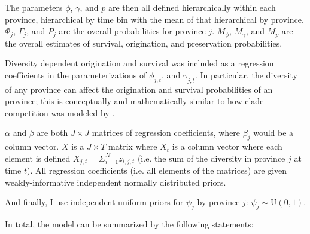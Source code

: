 \documentclass[12pt,letterpaper]{article}
\begin{document}
The parameters \(\phi\), \(\gamma\), and \(p\) are then all defined hierarchically within each province, hierarchical by time bin with the mean of that hierarchical by province. \(\Phi_{j}\), \(\Gamma_{j}\), and \(P_{j}\) are the overall probabilities for province \(j\). \(M_{\phi}\), \(M_{\gamma}\), and \(M_{p}\) are the overall estimates of survival, origination, and preservation probabilities. 

Diversity dependent origination and survival was included as a regression coefficients in the parameterizations of \(\phi_{j, t}\), and \(\gamma_{j, t}\). In particular, the diversity of any province can affect the origination and survival probabilities of an province; this is conceptually and mathematically similar to how clade competition was modeled by \citet{Silvestro2015b}. 

\(\alpha\) and \(\beta\) are both \(J \times J\) matrices of regression coefficients, where \(\beta_{j}\) would be a column vector. \(X\) is a \(J \times T\) matrix where \(X_{t}\) is a column vector where each element is defined \(X_{j, t} = \Sigma_{i = 1}^{N} z_{i, j, t}\) (i.e. the sum of the diversity in province \(j\) at time \(t\)). All regression coefficients (i.e. all elements of the matrices) are given weakly-informative independent normally distributed priors.

And finally, I use independent uniform priors for \(\psi_{j}\) by province \(j\): \(\psi_{j} \sim \mathrm{U}(0, 1)\).

In total, the model can be summarized by the following statements:
\end{document}
